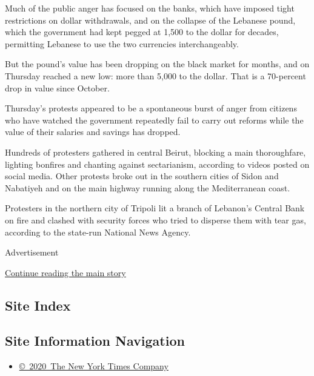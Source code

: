 Much of the public anger has focused on the banks, which have imposed
tight restrictions on dollar withdrawals, and on the collapse of the
Lebanese pound, which the government had kept pegged at 1,500 to the
dollar for decades, permitting Lebanese to use the two currencies
interchangeably.

But the pound's value has been dropping on the black market for months,
and on Thursday reached a new low: more than 5,000 to the dollar. That
is a 70-percent drop in value since October.

Thursday's protests appeared to be a spontaneous burst of anger from
citizens who have watched the government repeatedly fail to carry out
reforms while the value of their salaries and savings has dropped.

Hundreds of protesters gathered in central Beirut, blocking a main
thoroughfare, lighting bonfires and chanting against sectarianism,
according to videos posted on social media. Other protests broke out in
the southern cities of Sidon and Nabatiyeh and on the main highway
running along the Mediterranean coast.

Protesters in the northern city of Tripoli lit a branch of Lebanon's
Central Bank on fire and clashed with security forces who tried to
disperse them with tear gas, according to the state-run National News
Agency.

Advertisement

\protect\hyperlink{after-bottom}{Continue reading the main story}

\hypertarget{site-index}{%
\subsection{Site Index}\label{site-index}}

\hypertarget{site-information-navigation}{%
\subsection{Site Information
Navigation}\label{site-information-navigation}}

\begin{itemize}
\tightlist
\item
  \href{https://help.nytimes3xbfgragh.onion/hc/en-us/articles/115014792127-Copyright-notice}{©~2020~The
  New York Times Company}
\end{itemize}

